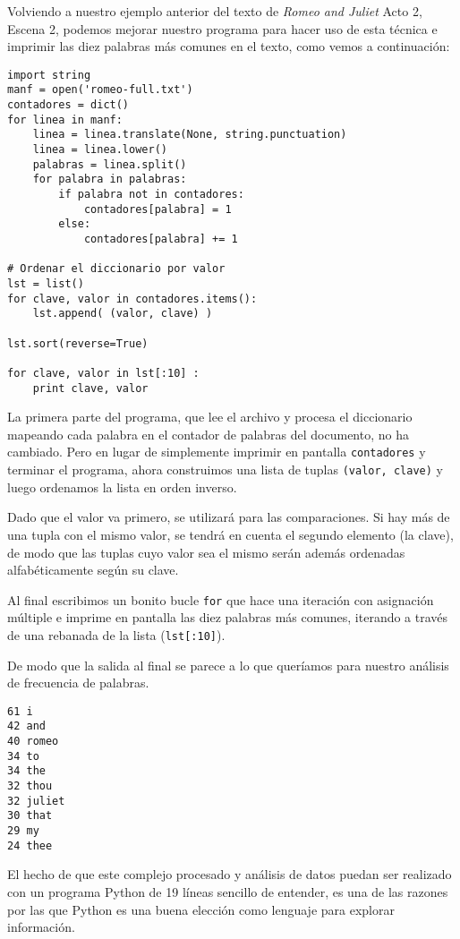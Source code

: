 Volviendo a nuestro ejemplo anterior del texto de \emph{Romeo and Juliet}
Acto 2, Escena 2, podemos mejorar nuestro programa para hacer uso de esta técnica e
imprimir las diez palabras más comunes en el texto, como vemos a continuación:

\beforeverb
\begin{verbatim}
import string
manf = open('romeo-full.txt')
contadores = dict()
for linea in manf:
    linea = linea.translate(None, string.punctuation)
    linea = linea.lower()
    palabras = linea.split()
    for palabra in palabras:
        if palabra not in contadores:
            contadores[palabra] = 1
        else:
            contadores[palabra] += 1

# Ordenar el diccionario por valor
lst = list()
for clave, valor in contadores.items():
    lst.append( (valor, clave) )

lst.sort(reverse=True)

for clave, valor in lst[:10] :
    print clave, valor
\end{verbatim}
\afterverb
%
La primera parte del programa, que lee el archivo y procesa
el diccionario mapeando cada palabra en el contador de palabras del
documento, no ha cambiado. Pero en lugar de simplemente imprimir en pantalla
{\tt contadores} y terminar el programa, ahora construimos una
lista de tuplas {\tt (valor, clave)} y luego ordenamos la lista en orden inverso.

Dado que el valor va primero, se utilizará para las comparaciones.
Si hay más de una tupla con el mismo valor, se tendrá en cuenta
el segundo elemento (la clave), de modo que las tuplas cuyo valor sea
el mismo serán además ordenadas alfabéticamente según su clave.

Al final escribimos un bonito bucle {\tt for} que hace una iteración con
asignación múltiple e imprime en pantalla las diez palabras más comunes,
iterando a través de una rebanada de la lista ({\tt lst[:10]}).

De modo que la salida al final se parece a lo que queríamos para
nuestro análisis de frecuencia de palabras.

\beforeverb
\begin{verbatim}
61 i
42 and
40 romeo
34 to
34 the
32 thou
32 juliet
30 that
29 my
24 thee
\end{verbatim}
\afterverb
%
El hecho de que este complejo procesado y análisis de datos
puedan ser realizado con un programa Python de 19 líneas
sencillo de entender, es una de las razones por las que Python es una buena elección
como lenguaje para explorar información.

